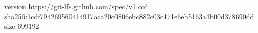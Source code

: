version https://git-lfs.github.com/spec/v1
oid sha256:1cdf794269560414917aca20c0806ebc882c03c171e6eb5163a4b00d378690dd
size 699192

